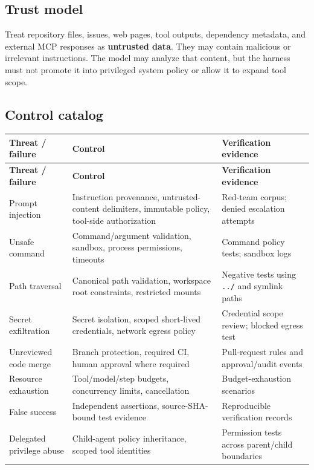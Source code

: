 \documentclass[10pt,letterpaper]{article}
\newcommand{\term}[1]{\textbf{\color{DeepBlue}#1}}
\newcommand{\code}[1]{\texttt{#1}}
\begin{document}
\subsection{Trust model}
Treat repository files, issues, web pages, tool outputs, dependency metadata, and external MCP responses as \term{untrusted data}. They may contain malicious or irrelevant instructions. The model may analyze that content, but the harness must not promote it into privileged system policy or allow it to expand tool scope.

\subsection{Control catalog}
\begin{longtable}{L{3.15cm} L{5.6cm} L{6.0cm}}
\toprule
\textbf{Threat / failure} & \textbf{Control} & \textbf{Verification evidence} \\
\midrule
\endfirsthead
\toprule
\textbf{Threat / failure} & \textbf{Control} & \textbf{Verification evidence} \\
\midrule
\endhead
Prompt injection & Instruction provenance, untrusted-content delimiters, immutable policy, tool-side authorization & Red-team corpus; denied escalation attempts \\
Unsafe command & Command/argument validation, sandbox, process permissions, timeouts & Command policy tests; sandbox logs \\
Path traversal & Canonical path validation, workspace root constraints, restricted mounts & Negative tests using \code{../} and symlink paths \\
Secret exfiltration & Secret isolation, scoped short-lived credentials, network egress policy & Credential scope review; blocked egress test \\
Unreviewed code merge & Branch protection, required CI, human approval where required & Pull-request rules and approval/audit events \\
Resource exhaustion & Tool/model/step budgets, concurrency limits, cancellation & Budget-exhaustion scenarios \\
False success & Independent assertions, source-SHA-bound test evidence & Reproducible verification records \\
Delegated privilege abuse & Child-agent policy inheritance, scoped tool identities & Permission tests across parent/child boundaries \\
\bottomrule
\end{longtable}
\end{document}
